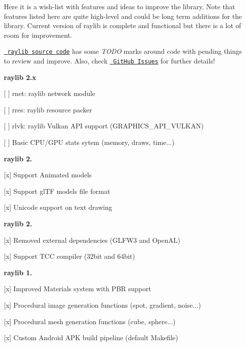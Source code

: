 Here it is a wish-\/list with features and ideas to improve the library. Note that features listed here are quite high-\/level and could be long term additions for the library. Current version of raylib is complete and functional but there is a lot of room for improvement.

\href{https://github.com/raysan5/raylib/tree/master/src}{\texttt{ raylib source code}} has some {\itshape T\+O\+DO} marks around code with pending things to review and improve. Also, check \href{https://github.com/raysan5/raylib/issues}{\texttt{ Git\+Hub Issues}} for further details!

{\bfseries{raylib 2.\+x}}
\begin{DoxyItemize}
\item \mbox{[} \mbox{]} rnet\+: raylib network module
\item \mbox{[} \mbox{]} rres\+: raylib resource packer
\item \mbox{[} \mbox{]} rlvk\+: raylib Vulkan A\+PI support (G\+R\+A\+P\+H\+I\+C\+S\+\_\+\+A\+P\+I\+\_\+\+V\+U\+L\+K\+AN)
\item \mbox{[} \mbox{]} Basic C\+P\+U/\+G\+PU stats sytem (memory, draws, time...)
\end{DoxyItemize}

{\bfseries{raylib 2.}}
\begin{DoxyItemize}
\item \mbox{[}x\mbox{]} Support Animated models
\item \mbox{[}x\mbox{]} Support gl\+TF models file format
\item \mbox{[}x\mbox{]} Unicode support on text drawing
\end{DoxyItemize}

{\bfseries{raylib 2.}}
\begin{DoxyItemize}
\item \mbox{[}x\mbox{]} Removed external dependencies (G\+L\+F\+W3 and Open\+AL)
\item \mbox{[}x\mbox{]} Support T\+CC compiler (32bit and 64bit)
\end{DoxyItemize}

{\bfseries{raylib 1.}}
\begin{DoxyItemize}
\item \mbox{[}x\mbox{]} Improved Materials system with P\+BR support
\item \mbox{[}x\mbox{]} Procedural image generation functions (spot, gradient, noise...)
\item \mbox{[}x\mbox{]} Procedural mesh generation functions (cube, sphere...)
\item \mbox{[}x\mbox{]} Custom Android A\+PK build pipeline (default Makefile)
\end{DoxyItemize}


